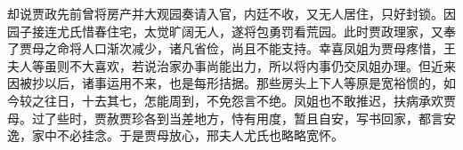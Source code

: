 


\begin{parag}
    却说贾政先前曾将房产并大观园奏请入官，内廷不收，又无人居住，只好封锁。因园子接连尤氏惜春住宅，太觉旷阔无人，遂将包勇罚看荒园。此时贾政理家，又奉了贾母之命将人口渐次减少，诸凡省俭，尚且不能支持。幸喜凤姐为贾母疼惜，王夫人等虽则不大喜欢，若说治家办事尚能出力，所以将内事仍交凤姐办理。但近来因被抄以后，诸事运用不来，也是每形拮据。那些房头上下人等原是宽裕惯的，如今较之往日，十去其七，怎能周到，不免怨言不绝。凤姐也不敢推迟，扶病承欢贾母。过了些时，贾赦贾珍各到当差地方，恃有用度，暂且自安，写书回家，都言安逸，家中不必挂念。于是贾母放心，邢夫人尤氏也略略宽怀。
\end{parag}


\begin{parag}

\end{parag}
